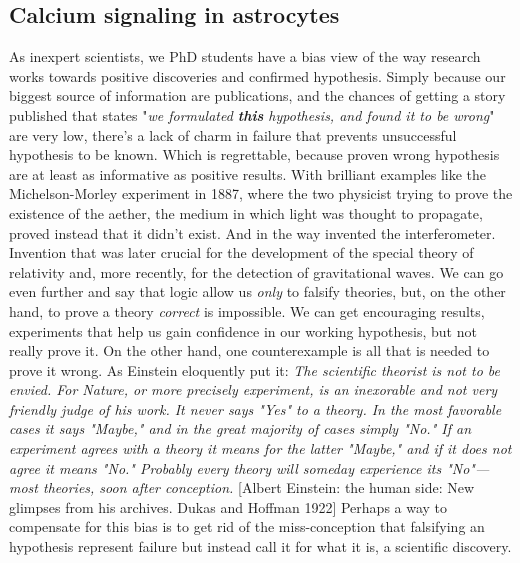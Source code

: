 \subsection{Calcium signaling in astrocytes}
\label{chap1:sec:2:subsec1:astro_calcium_signals}
As inexpert scientists, we PhD students have a bias view of the way research works towards positive discoveries and confirmed hypothesis. 
Simply because our biggest source of information are publications, and the chances of getting a story published that states "\textit{we formulated \textbf{this} hypothesis, and found it to be wrong}" are very low, there's a lack of charm in failure that prevents unsuccessful hypothesis to be known. 
Which is regrettable, because proven wrong hypothesis are at least as informative as positive results.
With brilliant examples like the Michelson-Morley experiment in 1887, where the two physicist trying to prove the existence of the aether, the medium in which light was thought to propagate, proved instead that it didn't exist.  
And in the way invented the interferometer. 
Invention that was later crucial for the development of the special theory of relativity and, more recently, for the detection of gravitational waves.
We can go even further and say that logic allow us \textit{only} to falsify theories, but, on the other hand, to prove a theory \textit{correct} is impossible. 
We can get encouraging results, experiments that help us gain confidence in our working hypothesis, but not really prove it.
On the other hand, one counterexample is all that is needed to prove it wrong.
As Einstein eloquently put it: \textit{The scientific theorist is not to be envied. For Nature, or more precisely experiment, is an inexorable and not very friendly judge of his work. It never says "Yes" to a theory. In the most favorable cases it says "Maybe," and in the great majority of cases simply "No." If an experiment agrees with a theory it means for the latter "Maybe," and if it does not agree it means "No." Probably every theory will someday experience its "No"—most theories, soon after conception.} [Albert Einstein: the human side: New glimpses from his archives. Dukas and Hoffman 1922]
Perhaps a way to compensate for this bias is to get rid of the miss-conception that falsifying an hypothesis represent failure but instead call it for what it is, a scientific discovery.  

